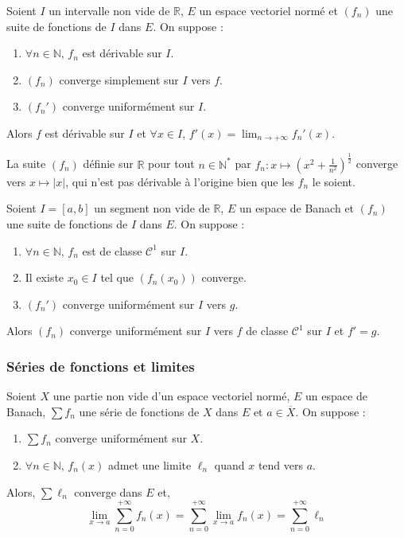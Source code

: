   \begin{theorem}
    Soient $I$ un intervalle non vide de $\mathbb{R}$, $E$ un espace vectoriel normé et $(f_n)$ une suite de fonctions de $I$ dans $E$. On suppose :
    \begin{enumerate}[label={\bfseries(\roman*)}]
      \item $\forall n \in \mathbb{N}, \, f_n$ est dérivable sur $I$.
      \item $(f_n)$ converge simplement sur $I$ vers $f$.
      \item $(f_n')$ converge uniformément sur $I$.
    \end{enumerate}
    Alors $f$ est dérivable sur $I$ et $\forall x \in I$, $f'(x) = \lim_{n \rightarrow +\infty} f_n'(x)$.
  \end{theorem}

  \begin{cexample}
    La suite $(f_n)$ définie sur $\mathbb{R}$ pour tout $n \in \mathbb{N}^*$ par $f_n : x \mapsto \left( x^2 + \frac{1}{n^2} \right)^{\frac{1}{2}}$ converge vers $x \mapsto \vert x \vert$, qui n'est pas dérivable à l'origine bien que les $f_n$ le soient.
  \end{cexample}

  \begin{theorem}
    Soient $I = [a,b]$ un segment non vide de $\mathbb{R}$, $E$ un espace de Banach et $(f_n)$ une suite de fonctions de $I$ dans $E$. On suppose :
    \begin{enumerate}[label={\bfseries(\roman*)}]
      \item $\forall n \in \mathbb{N}, \, f_n$ est de classe $\mathcal{C}^1$ sur $I$.
      \item Il existe $x_0 \in I$ tel que $(f_n(x_0))$ converge.
      \item $(f_n')$ converge uniformément sur $I$ vers $g$.
    \end{enumerate}
    Alors $(f_n)$ converge uniformément sur $I$ vers $f$ de classe $\mathcal{C}^1$ sur $I$ et $f' = g$.
  \end{theorem}

  \subsubsection{Séries de fonctions et limites}


  \begin{theorem}
    Soient $X$ une partie non vide d'un espace vectoriel normé, $E$ un espace de Banach, $\sum f_n$ une série de fonctions de $X$ dans $E$ et $a \in \overline{X}$. On suppose :
    \begin{enumerate}[label={\bfseries(\roman*)}]
      \item $\sum f_n$ converge uniformément sur $X$.
      \item $\forall n \in \mathbb{N}, \, f_n(x)$ admet une limite $\ell_n$ quand $x$ tend vers $a$.
    \end{enumerate}
    Alors, $\sum \ell_n$ converge dans $E$ et,
    \[ \lim_{x \rightarrow a} \sum_{n=0}^{+\infty} f_n(x) = \sum_{n=0}^{+\infty} \lim_{x \rightarrow a} f_n(x) = \sum_{n=0}^{+\infty} \ell_n \]
  \end{theorem}

